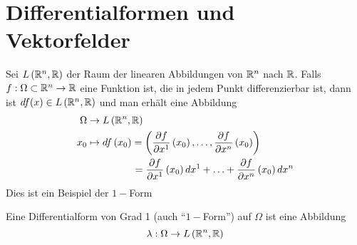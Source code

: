 \section{Differentialformen und Vektorfelder}
Sei $L\left(\mathbb{R}^n,\mathbb{R}\right)$ der Raum der linearen Abbildungen von $\mathbb{R}^n$ nach $\mathbb{R}$. Falls $f:\Omega\subset\mathbb{R}^n\to\mathbb{R}$ eine Funktion ist, die in jedem Punkt differenzierbar ist, dann ist $df(x)\in L\left(\mathbb{R}^n,\mathbb{R}\right)$ und man erhält eine Abbildung
\begin{align*}
\Omega &\to L\left(\R^n,\R\right)\\
x_0 &\mapsto df\left(x_0\right) = \left( {\frac{{\partial f}}{{\partial {x^1}}}\left( {{x_0}} \right), \ldots ,\frac{{\partial f}}{{\partial {x^n}}}\left( {{x_0}} \right)} \right)\\
& \hspace{16mm}=  \frac{{\partial f}}{{\partial {x^1}}}\left( {{x_0}} \right)d{x^1} +  \ldots  + \frac{{\partial f}}{{\partial {x^n}}}\left( {{x_0}} \right)d{x^n}
\end{align*}
Dies ist ein Beispiel der $1-$Form

\begin{definition}{8.26}
Eine Differentialform von Grad 1 (auch ``$1-$Form'') auf $\Omega$ ist eine Abbildung \[\lambda :\Omega\to L\left(\mathbb{R}^n,\mathbb{R}\right)\]
\end{definition}
